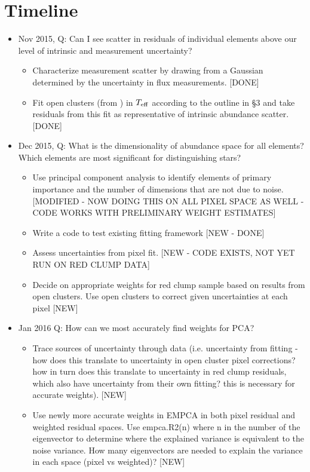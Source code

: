 \documentclass[preprint]{aastex}
\begin{document}
\section{Timeline}
\label{sec:timeline}

\begin{itemize}
\item Nov 2015, Q: Can I see scatter in residuals of individual elements above our level of intrinsic and measurement uncertainty?
\begin{itemize}
\item Characterize measurement scatter by drawing from a Gaussian determined by the uncertainty in flux measurements. [DONE]
\item Fit open clusters (from \citealt{meszaros2015}) in $T_{\rm eff}$ according to the outline in \S3 and take residuals from this fit as representative of intrinsic abundance scatter. [DONE]
\end{itemize}
\item Dec 2015, Q: What is the dimensionality of abundance space for all elements? Which elements are most significant for distinguishing stars?
\begin{itemize}
\item Use principal component analysis to identify elements of primary importance and the number of dimensions that are not due to noise. [MODIFIED - NOW DOING THIS ON ALL PIXEL SPACE AS WELL - CODE WORKS WITH PRELIMINARY WEIGHT ESTIMATES]
\item Write a code to test existing fitting framework [NEW - DONE]
\item Assess uncertainties from pixel fit. [NEW - CODE EXISTS, NOT YET RUN ON RED CLUMP DATA]
\item Decide on appropriate weights for red clump sample based on results from open clusters. Use open clusters to correct given uncertainties at each pixel [NEW]
\end{itemize}
\item Jan 2016 Q: How can we most accurately find weights for PCA?
\begin{itemize}
\item Trace sources of uncertainty through data (i.e. uncertainty from fitting - how does this translate to uncertainty in open cluster pixel corrections? how in turn does this translate to uncertainty in red clump residuals, which also have uncertainty from their own fitting? this is necessary for accurate weights). [NEW]
\item Use newly more accurate weights in EMPCA in both pixel residual and weighted residual spaces. Use empca.R2(n) where n in the number of the eigenvector to determine where the explained variance is equivalent to the noise variance. How many eigenvectors are needed to explain the variance in each space (pixel vs weighted)? [NEW]

\end{itemize}
\end{itemize}
\end{document}
